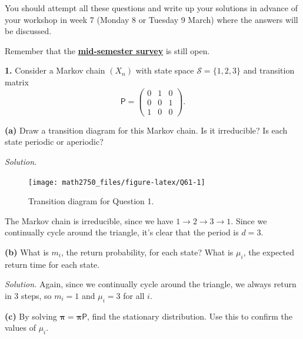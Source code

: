 \documentclass[
  a4paper,
]{article}
\newif\ifcomm\commtrue
\theoremstyle{definition}
\theoremstyle{definition}
\theoremstyle{definition}
\theoremstyle{remark}
\begin{document}
\commtrue

You should attempt all these questions and write up your solutions in advance of your workshop in week 7 (Monday 8 or Tuesday 9 March) where the answers will be discussed.

Remember that the \textbf{\href{https://forms.office.com/Pages/ResponsePage.aspx?id=qO3qvR3IzkWGPlIypTW3ywARQdZlKXRHsLcXi_ngX8NUM0NLOFFaQURFVExJMklIRjdVM04wQk8xTy4u}{mid-semester survey}} is still open.

\textbf{1.} Consider a Markov chain \((X_n)\) with state space \(\mathcal S =\{1,2,3\}\) and transition matrix
\[ \mathsf P = \begin{pmatrix} 0 & 1 & 0 \\ 0 & 0 & 1 \\ 1 & 0 & 0 \end{pmatrix}.   \]

\textbf{(a)} Draw a transition diagram for this Markov chain. Is it irreducible? Is each state periodic or aperiodic?

\begin{myanswers}

\emph{Solution.}

\begin{figure}

{\centering \texttt{[image: math2750\_files/figure-latex/Q61-1]} 

}

\caption{Transition diagram for Question 1.}\label{fig:Q61}
\end{figure}

The Markov chain is irreducible, since we have \(1 \to 2 \to 3 \to 1\). Since we continually cycle around the triangle, it's clear that the period is \(d = 3\).

\end{myanswers}

\textbf{(b)} What is \(m_i\), the return probability, for each state? What is \(\mu_i\), the expected return time for each state.

\begin{myanswers}
\emph{Solution.}
Again, since we continually cycle around the triangle, we always return in \(3\) steps, so \(m_i = 1\) and \(\mu_i =3\) for all \(i\).

\end{myanswers}

\textbf{(c)} By solving \(\boldsymbol \pi = \boldsymbol\pi \mathsf P\), find the stationary distribution. Use this to confirm the values of \(\mu_i\).
\end{document}
